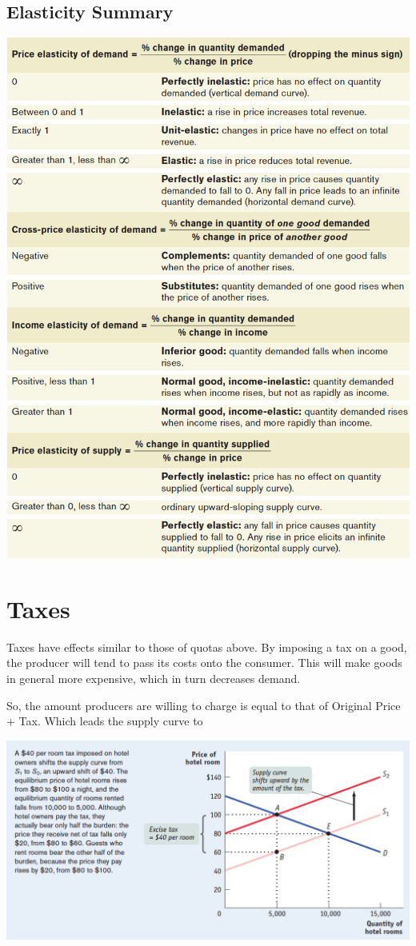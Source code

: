 \documentclass[english,course,draft]{Notes}
\begin{document}
\subsection{Elasticity Summary}
\includegraphics[height=1.1\textwidth]{elasticSum}
 
 \newpage
 
 \section{Taxes} 


\par{Taxes have effects similar to those of quotas above. By imposing a tax on a good, the producer will tend to pass its costs onto the consumer. This will make goods in general more expensive, which in turn decreases demand.}
\par{So,  the amount producers are willing to charge is equal to that of Original Price + Tax. Which leads the supply curve to }

\includegraphics[width=\textwidth]{tax1}
\end{document}
